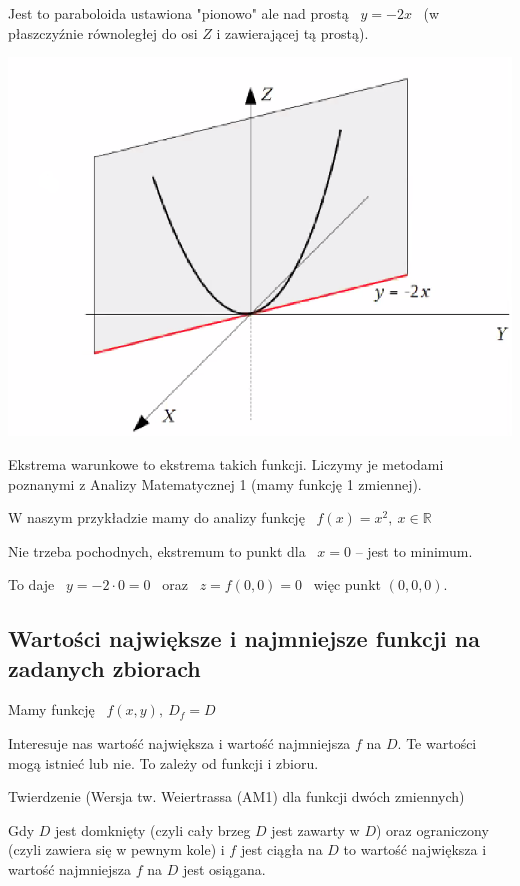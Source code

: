 Jest to paraboloida ustawiona "pionowo" ale nad prostą \ $ y= -2x $ \ (w płaszczyźnie równoległej do osi $Z$ i zawierającej tą prostą).

\begin{center}
\includegraphics[scale=0.5]{img/paraboloida_przyklad.png}
\end{center}

Ekstrema warunkowe to ekstrema takich funkcji. Liczymy je metodami poznanymi z Analizy Matematycznej 1 (mamy funkcję 1 zmiennej).

W naszym przykładzie mamy do analizy funkcję \ $ f(x) = x^2, \ x \in \mathbb{R} $

Nie trzeba pochodnych, ekstremum to punkt dla \ $x = 0$ -- jest to minimum.

To daje \ $ y = -2 \cdot 0 = 0 $ \ oraz \ $ z = f(0,0) = 0 $ \ więc punkt $ (0,0,0) $.

\subsection*{Wartości największe i najmniejsze funkcji na zadanych zbiorach}

Mamy funkcję \ $ f(x,y), \ D_f = D $

Interesuje nas wartość największa i wartość najmniejsza $f$ na $D$. Te wartości mogą istnieć lub nie. To zależy od funkcji i zbioru.
\bigskip

\begin{tw}{Twierdzenie (Wersja tw. Weiertrassa (AM1) dla funkcji dwóch zmiennych)}

Gdy $D$ jest domknięty (czyli cały brzeg $D$ jest zawarty w $D$) oraz ograniczony (czyli zawiera się w pewnym kole) i $f$ jest ciągła
na $D$ to wartość największa i wartość najmniejsza $f$ na $D$ jest osiągana.
\end{tw}
\bigskip

